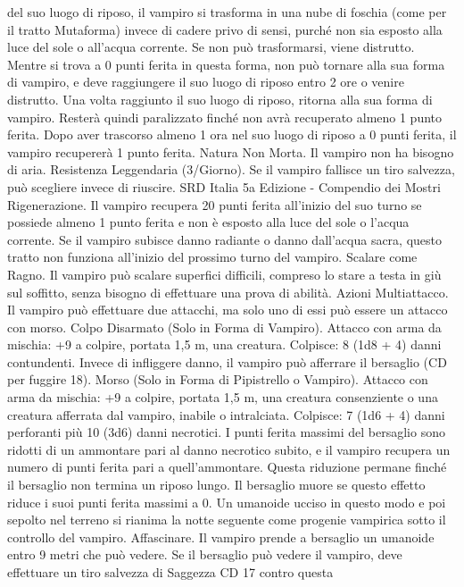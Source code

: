 \begin{multicols}{2}
del suo luogo di riposo, il vampiro si trasforma in una nube di
foschia (come per il tratto Mutaforma) invece di cadere privo di
sensi, purché non sia esposto alla luce del sole o all’acqua
corrente. Se non può trasformarsi, viene distrutto.
Mentre si trova a 0 punti ferita in questa forma, non può tornare
alla sua forma di vampiro, e deve raggiungere il suo luogo di
riposo entro 2 ore o venire distrutto. Una volta raggiunto il suo
luogo di riposo, ritorna alla sua forma di vampiro. Resterà quindi
paralizzato finché non avrà recuperato almeno 1 punto ferita.
Dopo aver trascorso almeno 1 ora nel suo luogo di riposo a 0
punti ferita, il vampiro recupererà 1 punto ferita.
Natura Non Morta. Il vampiro non ha bisogno di aria.
Resistenza Leggendaria (3/Giorno). Se il vampiro fallisce un
tiro salvezza, può scegliere invece di riuscire.
SRD Italia 5a Edizione - Compendio dei Mostri
Rigenerazione. Il vampiro recupera 20 punti ferita all’inizio del
suo turno se possiede almeno 1 punto ferita e non è esposto alla
luce del sole o l’acqua corrente. Se il vampiro subisce danno
radiante o danno dall’acqua sacra, questo tratto non funziona
all’inizio del prossimo turno del vampiro.
Scalare come Ragno. Il vampiro può scalare superfici difficili,
compreso lo stare a testa in giù sul soffitto, senza bisogno di
effettuare una prova di abilità.
Azioni
Multiattacco. Il vampiro può effettuare due attacchi, ma solo uno
di essi può essere un attacco con morso.
Colpo Disarmato (Solo in Forma di Vampiro). Attacco con
arma da mischia: +9 a colpire, portata 1,5 m, una creatura.
Colpisce: 8 (1d8 + 4) danni contundenti. Invece di infliggere
danno, il vampiro può afferrare il bersaglio (CD per fuggire 18).
Morso (Solo in Forma di Pipistrello o Vampiro). Attacco con
arma da mischia: +9 a colpire, portata 1,5 m, una creatura
consenziente o una creatura afferrata dal vampiro, inabile o
intralciata.
Colpisce: 7 (1d6 + 4) danni perforanti più 10 (3d6) danni
necrotici. I punti ferita massimi del bersaglio sono ridotti di un
ammontare pari al danno necrotico subito, e il vampiro recupera
un numero di punti ferita pari a quell’ammontare. Questa
riduzione permane finché il bersaglio non termina un riposo
lungo. Il bersaglio muore se questo effetto riduce i suoi punti
ferita massimi a 0. Un umanoide ucciso in questo modo e poi
sepolto nel terreno si rianima la notte seguente come progenie
vampirica sotto il controllo del vampiro.
Affascinare. Il vampiro prende a bersaglio un umanoide entro 9
metri che può vedere. Se il bersaglio può vedere il vampiro, deve
effettuare un tiro salvezza di Saggezza CD 17 contro questa

\end{multicols}

